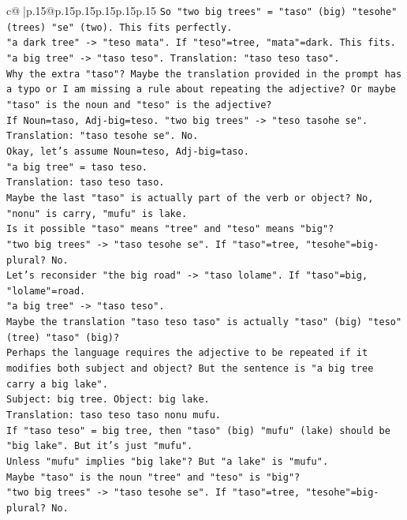 \documentclass{article}
\begin{document}
{\begin{supertabular}{c@{$\;$}|p{.15\linewidth}@{}p{.15\linewidth}p{.15\linewidth}p{.15\linewidth}p{.15\linewidth}p{.15\linewidth}}
{{{\texttt{So "two big trees" = "taso" (big) "tesohe" (trees) "se" (two). This fits perfectly.} \\
\texttt{"a dark tree" {-}> "teso mata". If "teso"=tree, "mata"=dark. This fits.} \\
\texttt{"a big tree" {-}> "taso teso". Translation: "taso teso taso".} \\
\texttt{Why the extra "taso"? Maybe the translation provided in the prompt has a typo or I am missing a rule about repeating the adjective? Or maybe "taso" is the noun and "teso" is the adjective?} \\
\texttt{If Noun=taso, Adj{-}big=teso. "two big trees" {-}> "teso tasohe se". Translation: "taso tesohe se". No.} \\
\texttt{Okay, let's assume Noun=teso, Adj{-}big=taso.} \\
\texttt{"a big tree" = taso teso.} \\
\texttt{Translation: taso teso taso.} \\
\texttt{Maybe the last "taso" is actually part of the verb or object? No, "nonu" is carry, "mufu" is lake.} \\
\texttt{Is it possible "taso" means "tree" and "teso" means "big"?} \\
\texttt{"two big trees" {-}> "taso tesohe se". If "taso"=tree, "tesohe"=big{-}plural? No.} \\
\texttt{Let's reconsider "the big road" {-}> "taso lolame". If "taso"=big, "lolame"=road.} \\
\texttt{"a big tree" {-}> "taso teso".} \\
\texttt{Maybe the translation "taso teso taso" is actually "taso" (big) "teso" (tree) "taso" (big)?} \\
\texttt{Perhaps the language requires the adjective to be repeated if it modifies both subject and object? But the sentence is "a big tree carry a big lake".} \\
\texttt{Subject: big tree. Object: big lake.} \\
\texttt{Translation: taso teso taso nonu mufu.} \\
\texttt{If "taso teso" = big tree, then "taso" (big) "mufu" (lake) should be "big lake". But it's just "mufu".} \\
\texttt{Unless "mufu" implies "big lake"? But "a lake" is "mufu".} \\
\texttt{Maybe "taso" is the noun "tree" and "teso" is "big"?} \\
\texttt{"two big trees" {-}> "taso tesohe se". If "taso"=tree, "tesohe"=big{-}plural? No.} \\
}}}
\end{supertabular}}
\end{document}
